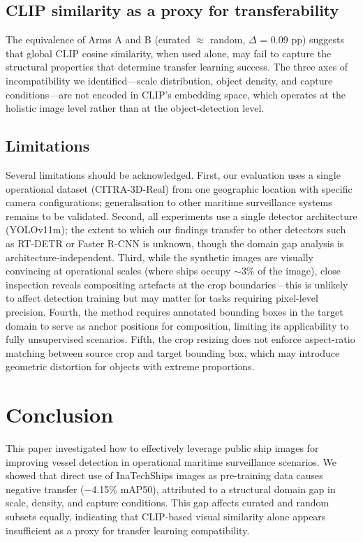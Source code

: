 \documentclass[a4paper,fleqn]{cas-dc}
\begin{document}
\subsection{CLIP similarity as a proxy for transferability}

The equivalence of Arms A and B (curated $\approx$ random, $\Delta$ = 0.09 pp) suggests that global CLIP cosine similarity, when used alone, may fail to capture the structural properties that determine transfer learning success. The three axes of incompatibility we identified---scale distribution, object density, and capture conditions---are not encoded in CLIP's embedding space, which operates at the holistic image level rather than at the object-detection level.

\subsection{Limitations}

Several limitations should be acknowledged. First, our evaluation uses a single operational dataset (CITRA-3D-Real) from one geographic location with specific camera configurations; generalisation to other maritime surveillance systems remains to be validated. Second, all experiments use a single detector architecture (YOLOv11m); the extent to which our findings transfer to other detectors such as RT-DETR or Faster R-CNN is unknown, though the domain gap analysis is architecture-independent. Third, while the synthetic images are visually convincing at operational scales (where ships occupy $\sim$3\% of the image), close inspection reveals compositing artefacts at the crop boundaries---this is unlikely to affect detection training but may matter for tasks requiring pixel-level precision. Fourth, the method requires annotated bounding boxes in the target domain to serve as anchor positions for composition, limiting its applicability to fully unsupervised scenarios. Fifth, the crop resizing does not enforce aspect-ratio matching between source crop and target bounding box, which may introduce geometric distortion for objects with extreme proportions.

\section{Conclusion}\label{sec:conclusion}

This paper investigated how to effectively leverage public ship images for improving vessel detection in operational maritime surveillance scenarios. We showed that direct use of InaTechShips images as pre-training data causes negative transfer ($-$4.15\% mAP50), attributed to a structural domain gap in scale, density, and capture conditions. This gap affects curated and random subsets equally, indicating that CLIP-based visual similarity alone appears insufficient as a proxy for transfer learning compatibility.
\end{document}
